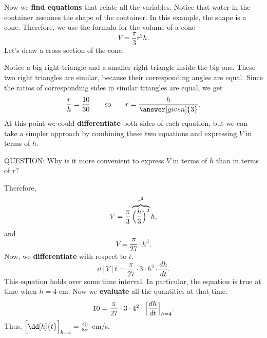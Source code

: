 \documentclass{ximera}
\begin{document}
\begin{example}
\begin{explanation}
Now we \textbf{find equations} that relate all the variables. Notice that water in the container assumes the shape of the container. In this example, the shape is a cone. Therefore, we use the formula for the volume of
a cone 
\[
V = \frac{\pi}{3} r^2 h.
\]
Let's draw a cross section of the cone.
\begin{image}
\end{image}
Notice a big right triangle and  a smaller right triangle inside the big one.
These two right triangles are similar, because their corresponding angles are equal.
Since the ratios of corresponding sides in similar triangles are equal, we get
\[
\frac{r}{h}=\frac{10}{30} \qquad\text{so}\qquad r=\frac{h}{\answer[given]{3}}.
\]  
At this point we could \textbf{differentiate} both sides of each equation, but we can take a simpler approach
by combining these two equations and expressing $V$ in terms of $h$.

QUESTION: Why is it more convenient to express $V$ in terms of $h$ than in terms of $r$?

Therefore,
\[
V = \frac{\pi}{3}\overbrace{ \Bigl(\frac{h}{3}\Bigr)^2}^{r^2} h,
\]
and
\[
V = \frac{\pi}{27} \cdot h^3.
\]
Now, we \textbf{differentiate} with respect to $t$.
\[
\dd[V]{t} = \frac{\pi}{27} \cdot 3\cdot h^2\cdot \frac{dh}{dt}.
\]
This  equation holds over some time interval. In particular, the equation is true at time when $h=4$ cm. 
Now we \textbf{evaluate} all the quantities at that time.
\[
10 = \frac{\pi}{27} \cdot 3\cdot 4^2\cdot \Bigl[\frac{dh}{dt}\Bigr]_{h=4}.
\]
Thus, $\Bigl[\dd[h]{t}\Bigr]_{h=4}=\frac{45}{8\pi}$ cm/s.
\end{explanation}
\end{example}
\end{document}
